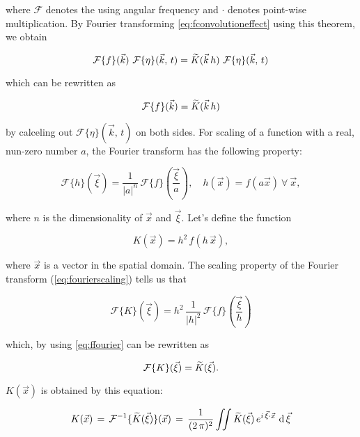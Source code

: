 where $\mathcal{F}$ denotes the  using angular frequency and $\cdot$ denotes point-wise multiplication. By Fourier transforming \eqref{eq:fconvolutioneffect} using this theorem, we obtain

\begin{equation}
\mathcal{F}\{f\}(\vec{k})\ \mathcal{F}\{\eta\}(\vec{k},\,t) = \fdfunc{K}(\vec{k}\,h)\ \mathcal{F}\{\eta\}(\vec{k},\,t)
\end{equation}

which can be rewritten as

\begin{equation} \label{eq:ffourier}
\mathcal{F}\{f\}(\vec{k}) = \widetilde{K}(\vec{k}\,h)
\end{equation}

by calceling out $\mathcal{F}\{\eta\}(\vec{k},\,t)$ on both sides. For scaling of a function with a real, nun-zero number $a$, the Fourier transform has the following property:

\begin{equation} \label{eq:fourierscaling}
\mathcal{F}\{h\}(\vec{\xi}) = \frac{1}{|a|^n}\,\mathcal{F}\{f\}\left(\frac{\vec{\xi}}{a}\right)
,\quad
h(\vec{x}) = f(a\vec{x})\ \forall\ \vec{x},
\end{equation}

where $n$ is the dimensionality of $\vec{x}$ and $\vec{\xi}$. Let's define the function

\begin{equation} \label{eq:ftokernel}
K(\vec{x}) = h^2\,f(h\,\vec{x}),
\end{equation}

where $\vec{x}$ is a  vector in the spatial domain. The scaling property of the Fourier transform (\eqref{eq:fourierscaling}) tells us that

\begin{equation}
\mathcal{F}\{K\}(\vec{\xi}) = h^2\,\frac{1}{|h|^2}\,\mathcal{F}\{f\}\left(\frac{\vec{\xi}}{h}\right)
\end{equation}

which, by using \eqref{eq:ffourier} can be rewritten as

\begin{equation}
\mathcal{F}\{K\}(\vec{\xi}) = \widetilde{K}(\vec{\xi}).
\end{equation}

$K(\vec{x})$ is obtained by  this equation:

\begin{equation} \label{eq:kernelfour2d}
K(\vec{x})\, = \,\mathcal{F}^{-1}\{\widetilde{K}(\vec{\xi})\}(\vec{x})\, = \,\frac{1}{(2\,\pi)^2}\iint\widetilde{K}(\vec{\xi})\,e^{i\,\vec{\xi}\cdot\vec{x}}\,\operatorname{d}\vec{\xi}
\end{equation}

